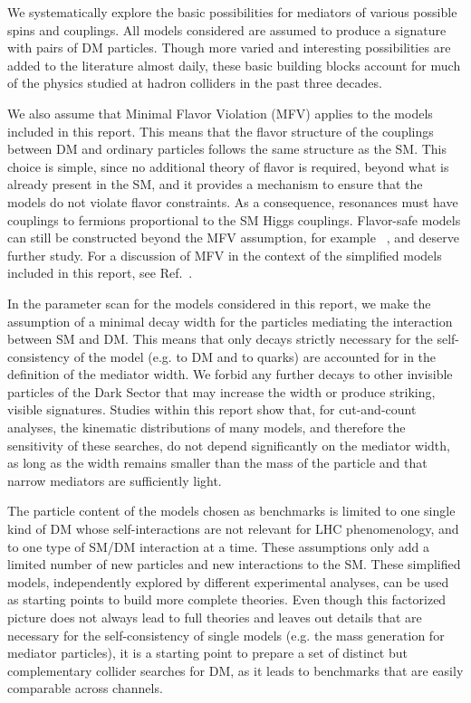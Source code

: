 We systematically explore the basic possibilities for
mediators of various possible spins and couplings.
All models considered are assumed to produce a signature with pairs of DM particles.
Though more varied and
interesting possibilities are added to the literature almost daily,
these basic building blocks account for much of the physics studied at
hadron colliders in the past three decades.

We also assume that Minimal Flavor Violation (MFV) \cite{Chivukula:1987py,Hall:1990ac,Buras:2000dm,DAmbrosio:2002ex} applies to the
models included in this report. This means that the flavor structure of the
couplings between DM and ordinary particles follows the same
structure as the SM. This choice is simple, since no
additional theory of flavor is required, beyond what is already
present in the SM, and it provides a mechanism to ensure that the
models do not violate flavor constraints.  As a consequence, \spinzero
resonances must have couplings to fermions proportional to the SM Higgs couplings. 
Flavor-safe models can still be constructed beyond the MFV
assumption, for example ~\cite{Agrawal:2014aoa}, and deserve further study.
For a discussion of MFV in the context of the simplified models
included in this report, see Ref.~\cite{DMatLHCProceedings}.

In the parameter scan for the models considered in this report, we make the
assumption of a minimal decay width for the particles mediating the
interaction between SM and DM.  This means that only decays
strictly necessary for the self-consistency of the model (e.g.  to DM
and to quarks) are accounted for in the definition of the mediator
width. We forbid any further decays to other invisible particles of
the Dark Sector that may increase the width or produce striking, visible signatures. 
Studies within this report show that, for cut-and-count analyses, the kinematic distributions of
many models, and therefore the sensitivity of these searches, do not depend
significantly on the mediator width, as long as the width remains smaller
than the mass of the particle and that narrow mediators are sufficiently light.

The particle content of the models chosen as benchmarks is limited to
one single kind of DM whose self-interactions are not relevant for LHC
phenomenology, and to one type of SM/DM interaction at a time. These
assumptions only add a limited number of new particles and new interactions to the
SM. These simplified models, independently explored by different
experimental analyses, can be used as starting points to build more
complete theories. Even though this factorized picture does not always
lead to full theories and leaves out details that are necessary for
the self-consistency of single models (e.g. the mass generation for
mediator particles), it is a starting point to prepare a set of
distinct but complementary collider searches for DM, as
it leads to benchmarks that are easily comparable across channels.

